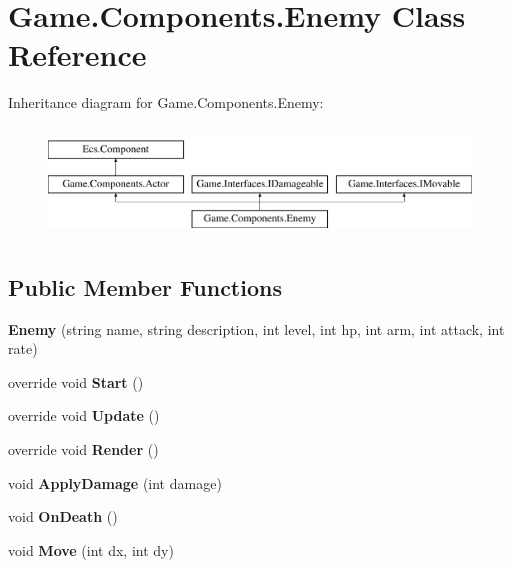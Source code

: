 \hypertarget{class_game_1_1_components_1_1_enemy}{}\section{Game.\+Components.\+Enemy Class Reference}
\label{class_game_1_1_components_1_1_enemy}
Inheritance diagram for Game.\+Components.\+Enemy\+:\begin{figure}[H]
\begin{center}
\leavevmode
\includegraphics[height=2.962963cm]{class_game_1_1_components_1_1_enemy}
\end{center}
\end{figure}
\subsection*{Public Member Functions}
\begin{DoxyCompactItemize}
\item 
\mbox{\label{class_game_1_1_components_1_1_enemy_a109666b6285493ec597aca97a3a842f9}} 
{\bfseries Enemy} (string name, string description, int level, int hp, int arm, int attack, int rate)
\item 
\mbox{\label{class_game_1_1_components_1_1_enemy_ab2cea47dab16b552b9be2c0c13d078fb}} 
override void {\bfseries Start} ()
\item 
\mbox{\label{class_game_1_1_components_1_1_enemy_a2f1d9495e7b2860044a34dff789f5b89}} 
override void {\bfseries Update} ()
\item 
\mbox{\label{class_game_1_1_components_1_1_enemy_a0e561eb1bcce3e1a66fcd973d02982f6}} 
override void {\bfseries Render} ()
\item 
\mbox{\label{class_game_1_1_components_1_1_enemy_af6d1357b07693138ca315f5064f22de1}} 
void {\bfseries Apply\+Damage} (int damage)
\item 
\mbox{\label{class_game_1_1_components_1_1_enemy_a084693a2505f011fa8c8103ecd01a126}} 
void {\bfseries On\+Death} ()
\item 
\mbox{\label{class_game_1_1_components_1_1_enemy_a2021a5a82cf1ce9c90b3433f5d304283}} 
void {\bfseries Move} (int dx, int dy)
\end{DoxyCompactItemize}
